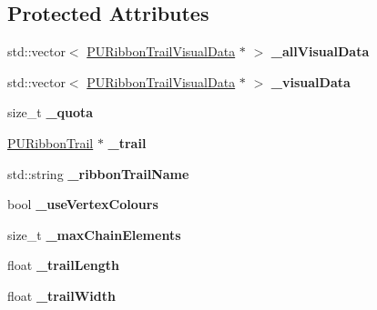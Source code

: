\subsection*{Protected Attributes}
\begin{DoxyCompactItemize}
\item 
\mbox{\label{classPURibbonTrailRender_a58aa39d69203ede75ebba5c929df6b20}} 
std\+::vector$<$ \hyperlink{classPURibbonTrailVisualData}{P\+U\+Ribbon\+Trail\+Visual\+Data} $\ast$ $>$ {\bfseries \+\_\+all\+Visual\+Data}
\item 
\mbox{\label{classPURibbonTrailRender_a992b7c83c2df2b7017850b698f6e76d2}} 
std\+::vector$<$ \hyperlink{classPURibbonTrailVisualData}{P\+U\+Ribbon\+Trail\+Visual\+Data} $\ast$ $>$ {\bfseries \+\_\+visual\+Data}
\item 
\mbox{\label{classPURibbonTrailRender_a4c6306cb0d45841a95f0f3248e0136a1}} 
size\+\_\+t {\bfseries \+\_\+quota}
\item 
\mbox{\label{classPURibbonTrailRender_afe57386839e1a85d5ed8b555729d63e4}} 
\hyperlink{classPURibbonTrail}{P\+U\+Ribbon\+Trail} $\ast$ {\bfseries \+\_\+trail}
\item 
\mbox{\label{classPURibbonTrailRender_a3e1fe7899d6b097ecf97bc4e36458800}} 
std\+::string {\bfseries \+\_\+ribbon\+Trail\+Name}
\item 
\mbox{\label{classPURibbonTrailRender_a29c893a849b39c8028c6259e54916462}} 
bool {\bfseries \+\_\+use\+Vertex\+Colours}
\item 
\mbox{\label{classPURibbonTrailRender_a618fd39fb00884d7fec8665b9b724e7f}} 
size\+\_\+t {\bfseries \+\_\+max\+Chain\+Elements}
\item 
\mbox{\label{classPURibbonTrailRender_a881bcdf8baa6821697f3a6c78ed19549}} 
float {\bfseries \+\_\+trail\+Length}
\item 
\mbox{\label{classPURibbonTrailRender_a84fe3e45edfe9827d654b9e43964f85d}} 
float {\bfseries \+\_\+trail\+Width}

\end{DoxyCompactItemize}
